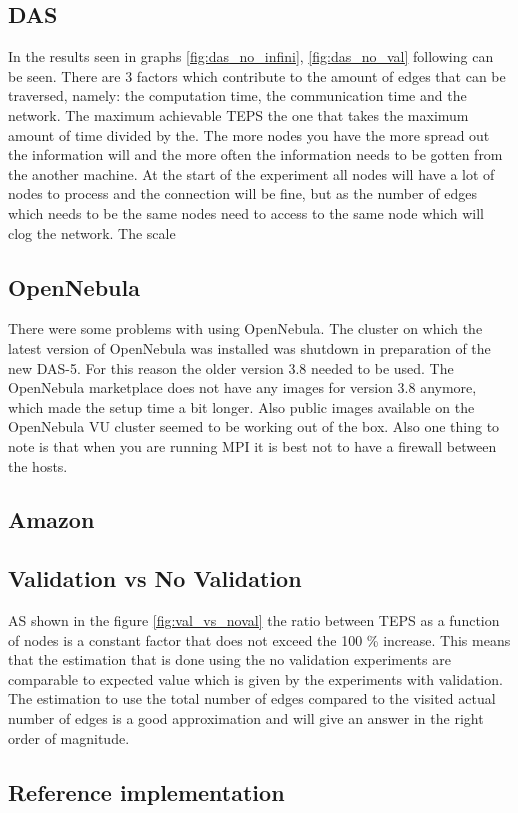 \subsection{DAS}
In the results seen in graphs \ref{fig:das_no_infini}, \ref{fig:das_no_val} following can be seen. There are 3 factors which contribute to the amount of edges that can be traversed, namely: the computation time, the communication time and the network. The maximum achievable TEPS the one that takes the maximum amount of time divided by the. The more nodes you have the more spread out the information will and the more often the information needs to be gotten from the another machine. At the start of the experiment all nodes will have a lot of nodes to process and the connection will be fine, but as the number of edges which needs to be the same nodes need to access to the same node which will clog the network.
The scale 




\subsection{OpenNebula}
There were some problems with using OpenNebula. The cluster on which the latest version of OpenNebula was installed was shutdown in preparation of the new DAS-5. For this reason the older version 3.8 needed to be used. The OpenNebula marketplace does not have any images for version 3.8 anymore, which made the setup time a bit longer. Also public images available on the OpenNebula VU cluster seemed to be working out of the box. Also one thing to note is that when you are running MPI it is best not to have a firewall between the hosts. 

\subsection{Amazon}

\subsection{Validation vs No Validation}
AS shown in the figure \ref{fig:val_vs_noval} the ratio between TEPS as a function of nodes is a constant factor that does not exceed the 100 \% increase. This means that the estimation that is done using the no validation experiments are comparable to expected value which is given by the experiments with validation. The estimation to use the total number of edges compared to the visited actual number of edges is a good approximation and will give an answer in the right order of magnitude. 

\subsection{Reference implementation}
